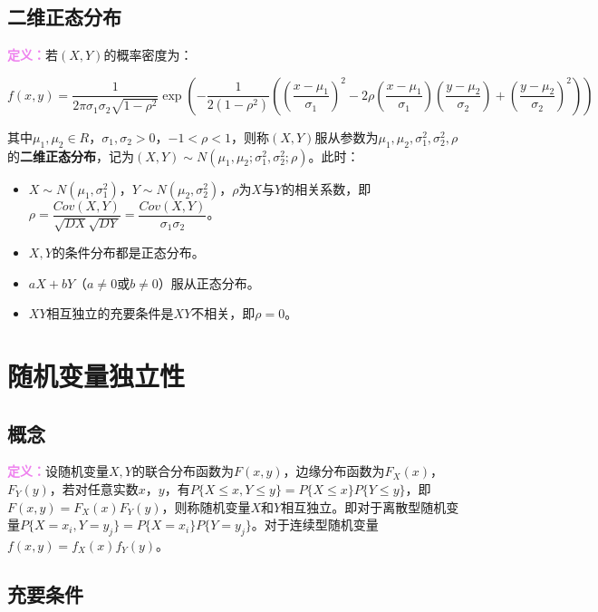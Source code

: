 \documentclass[UTF8, 12pt]{ctexart}
\begin{document}
\subsection{二维正态分布}

\textcolor{violet}{\textbf{定义：}}若$(X,Y)$的概率密度为：

{\fontsize{8.2pt}{10pt}$f(x,y)=\dfrac{1}{2\pi\sigma_1\sigma_2\sqrt{1-\rho^2}}\exp\left(-\dfrac{1}{2(1-\rho^2)}\left(\left(\dfrac{x-\mu_1}{\sigma_1}\right)^2-2\rho\left(\dfrac{x-\mu_1}{\sigma_1}\right)\left(\dfrac{y-\mu_2}{\sigma_2}\right)+\left(\dfrac{y-\mu_2}{\sigma_2}\right)^2\right)\right)$}

其中$\mu_1,\mu_2\in R$，$\sigma_1,\sigma_2>0$，$-1<\rho<1$，则称$(X,Y)$服从参数为$\mu_1,\mu_2,\sigma_1^2,\sigma_2^2,\rho$的\textbf{二维正态分布}，记为$(X,Y)\sim N(\mu_1,\mu_2;\sigma_1^2,\sigma_2^2;\rho)$。此时：

\begin{itemize}
    \item $X\sim N(\mu_1,\sigma_1^2)$，$Y\sim N(\mu_2,\sigma_2^2)$，$\rho$为$X$与$Y$的相关系数，即$\rho=\dfrac{Cov(X,Y)}{\sqrt{DX}\sqrt{DY}}=\dfrac{Cov(X,Y)}{\sigma_1\sigma_2}$。
    \item $X,Y$的条件分布都是正态分布。
    \item $aX+bY$（$a\neq0$或$b\neq0$）服从正态分布。
    \item $XY$相互独立的充要条件是$XY$不相关，即$\rho=0$。
\end{itemize}

\section{随机变量独立性}

\subsection{概念}

\textcolor{violet}{\textbf{定义：}}设随机变量$X,Y$的联合分布函数为$F(x,y)$，边缘分布函数为$F_X(x)$，$F_Y(y)$，若对任意实数$x$，$y$，有$P\{X\leqslant x,Y\leqslant y\}=P\{X\leqslant x\}P\{Y\leqslant y\}$，即$F(x,y)=F_X(x)F_Y(y)$，则称随机变量$X$和$Y$相互独立。即对于离散型随机变量$P\{X=x_i,Y=y_j\}=P\{X=x_i\}P\{Y=y_j\}$。对于连续型随机变量$f(x,y)=f_X(x)f_Y(y)$。

\subsection{充要条件}
\end{document}
